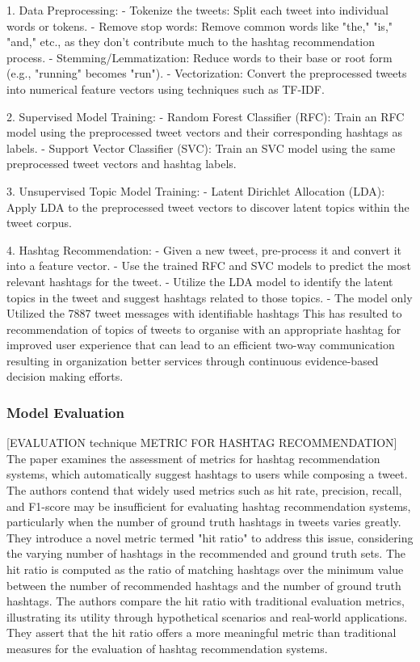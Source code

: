 1. Data Preprocessing:
   - Tokenize the tweets: Split each tweet into individual words or tokens.
   - Remove stop words: Remove common words like "the," "is," "and," etc., as they don't contribute much to the hashtag recommendation process.
   - Stemming/Lemmatization: Reduce words to their base or root form (e.g., "running" becomes "run").
   - Vectorization: Convert the preprocessed tweets into numerical feature vectors using techniques such as TF-IDF.

2. Supervised Model Training:
   - Random Forest Classifier (RFC): Train an RFC model using the preprocessed tweet vectors and their corresponding hashtags as labels.
   - Support Vector Classifier (SVC): Train an SVC model using the same preprocessed tweet vectors and hashtag labels.

3. Unsupervised Topic Model Training:
   - Latent Dirichlet Allocation (LDA): Apply LDA to the preprocessed tweet vectors to discover latent topics within the tweet corpus.

4. Hashtag Recommendation:
   - Given a new tweet, pre-process it and convert it into a feature vector.
   - Use the trained RFC and SVC models to predict the most relevant hashtags for the tweet.
   - Utilize the LDA model to identify the latent topics in the tweet and suggest hashtags related to those topics.
   - The model only Utilized the 7887 tweet messages with identifiable hashtags
This has resulted to recommendation of topics of tweets to organise with an appropriate hashtag for improved user experience that can lead to an efficient two-way communication resulting in organization better services through continuous evidence-based decision making efforts.

\subsubsection{Model Evaluation}

[EVALUATION technique METRIC FOR HASHTAG RECOMMENDATION] The paper examines the assessment of metrics for hashtag recommendation systems, which automatically suggest hashtags to users while composing a tweet. The authors contend that widely used metrics such as hit rate, precision, recall, and F1-score may be insufficient for evaluating hashtag recommendation systems, particularly when the number of ground truth hashtags in tweets varies greatly. They introduce a novel metric termed "hit ratio" to address this issue, considering the varying number of hashtags in the recommended and ground truth sets. The hit ratio is computed as the ratio of matching hashtags over the minimum value between the number of recommended hashtags and the number of ground truth hashtags. The authors compare the hit ratio with traditional evaluation metrics, illustrating its utility through hypothetical scenarios and real-world applications. They assert that the hit ratio offers a more meaningful metric than traditional measures for the evaluation of hashtag recommendation systems.

